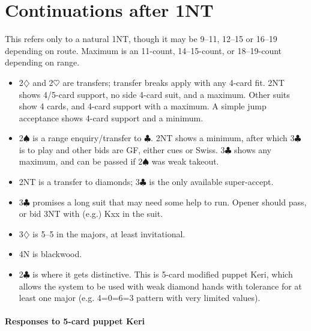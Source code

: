 \documentclass[a4paper,12pt]{article}
\begin{document}
\begin{itemize}
\end{itemize}

\section{Continuations after 1NT}

This refers only to a natural 1NT, though it may be 9--11, 12--15 or 16--19
depending on route. Maximum is an 11-count, 14--15-count, or 18--19-count
depending on range.

\begin{itemize}

\item 2$\diamondsuit$ and 2$\heartsuit$ are transfers; transfer breaks apply with any 4-card fit.  2NT
shows 4/5-card support, no side 4-card suit, and a maximum.  Other suits
show 4 cards, and 4-card support with a maximum.  A simple jump acceptance
shows 4-card support and a minimum.

\item 2$\spadesuit$ is a range enquiry/transfer to $\clubsuit$.  2NT shows a minimum, after which 3$\clubsuit$ is to
play and other bids are GF, either cues or Swiss.  3$\clubsuit$ shows any maximum, and
can be passed if 2$\spadesuit$ was weak takeout.

\item 2NT is a transfer to diamonds; 3$\clubsuit$ is the only available super-accept.

\item 3$\clubsuit$ promises a long suit that may need some help to run.  Opener should
pass, or bid 3NT with (e.g.) Kxx in the suit.

\item 3$\diamondsuit$ is 5--5 in the majors, at least invitational.

\item 4N is blackwood.

\item 2$\clubsuit$ is where it gets distinctive.  This is 5-card modified puppet Keri, which allows the system to be used with weak diamond hands with tolerance for at least one major (e.g. 4=0=6=3 pattern with very limited values).
\end{itemize}

\paragraph{Responses to 5-card puppet Keri}
\end{document}
